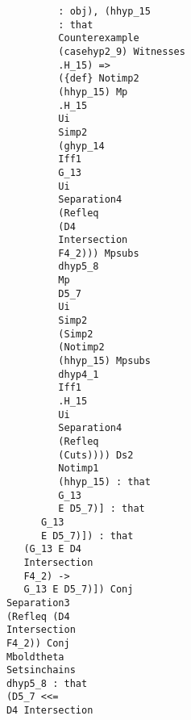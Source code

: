 \documentclass[12pt]{article}
\begin{document}
\begin{verbatim}
                                        : obj), (hhyp_15 
                                        : that 
                                        Counterexample 
                                        (casehyp2_9) Witnesses 
                                        .H_15) => 
                                        ({def} Notimp2 
                                        (hhyp_15) Mp 
                                        .H_15 
                                        Ui 
                                        Simp2 
                                        (ghyp_14 
                                        Iff1 
                                        G_13 
                                        Ui 
                                        Separation4 
                                        (Refleq 
                                        (D4 
                                        Intersection 
                                        F4_2))) Mpsubs 
                                        dhyp5_8 
                                        Mp 
                                        D5_7 
                                        Ui 
                                        Simp2 
                                        (Simp2 
                                        (Notimp2 
                                        (hhyp_15) Mpsubs 
                                        dhyp4_1 
                                        Iff1 
                                        .H_15 
                                        Ui 
                                        Separation4 
                                        (Refleq 
                                        (Cuts)))) Ds2 
                                        Notimp1 
                                        (hhyp_15) : that 
                                        G_13 
                                        E D5_7)] : that 
                                     G_13 
                                     E D5_7)]) : that 
                                  (G_13 E D4 
                                  Intersection 
                                  F4_2) -> 
                                  G_13 E D5_7)]) Conj 
                               Separation3 
                               (Refleq (D4 
                               Intersection 
                               F4_2)) Conj 
                               Mboldtheta 
                               Setsinchains 
                               dhyp5_8 : that 
                               (D5_7 <<= 
                               D4 Intersection 

\end{verbatim}
\end{document}
